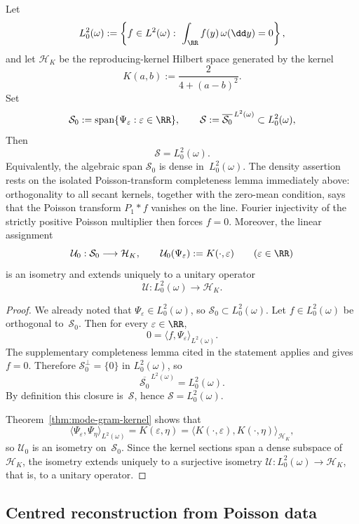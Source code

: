 \begin{theorem}%
\label{thm:mode-space-rkhs}
Let
\[
L^2_0(\omega):=
\left\{
f\in L^2(\omega):\ \int_{\RR}f(y)\,\omega(\dd y)=0
\right\},
\]
and let $\mathcal H_K$ be the reproducing-kernel Hilbert space generated
by the kernel
\[
K(a,b):=\frac{2}{4+(a-b)^2}.
\]
Set
\[
\mathcal S_0:=\operatorname{span}\{\Psi_\varepsilon:\varepsilon\in\RR\},
\qquad
\mathcal S:=\overline{\mathcal S_0}^{\,L^2(\omega)}
\subset L^2_0(\omega),
\]
Then
\[
\mathcal S=L^2_0(\omega).
\]
Equivalently, the algebraic span
$\mathcal S_0$ is dense in~$L^2_0(\omega)$.
The density assertion rests on the isolated Poisson-transform completeness
lemma immediately above: orthogonality to all secant kernels, together with
the zero-mean condition, says that the Poisson transform \(P_1*f\) vanishes
on the line.  Fourier injectivity of the strictly positive Poisson multiplier
then forces \(f=0\).
Moreover, the linear assignment
\[
\mathcal U_0:\mathcal S_0\longrightarrow \mathcal H_K,
\qquad
\mathcal U_0(\Psi_\varepsilon):=K(\cdot,\varepsilon)
\qquad(\varepsilon\in\RR)
\]
is an isometry and extends uniquely to a unitary operator
\[
\mathcal U:L^2_0(\omega)\longrightarrow \mathcal H_K.
\]
\end{theorem}

\begin{proof}
We already noted that $\Psi_\varepsilon\in L^2_0(\omega)$, so
$\mathcal S_0\subset L^2_0(\omega)$.  Let
$f\in L^2_0(\omega)$ be orthogonal to~$\mathcal S_0$.  Then for every
$\varepsilon\in\RR$,
\[
0=\langle f,\Psi_\varepsilon\rangle_{L^2(\omega)}.
\]
  The supplementary completeness lemma cited in the statement applies and
  gives $f=0$.
Therefore $\mathcal S_0^\perp=\{0\}$ in $L^2_0(\omega)$, so
\[
\overline{\mathcal S_0}^{\,L^2(\omega)}=L^2_0(\omega).
\]
By definition this closure is~$\mathcal S$, hence
$\mathcal S=L^2_0(\omega)$.

Theorem~\ref{thm:mode-gram-kernel} shows that
\[
\langle \Psi_\varepsilon,\Psi_\eta\rangle_{L^2(\omega)}
=K(\varepsilon,\eta)
=\langle K(\cdot,\varepsilon),K(\cdot,\eta)\rangle_{\mathcal H_K},
\]
so $\mathcal U_0$ is an isometry on~$\mathcal S_0$.  Since the
kernel sections span a dense subspace of~$\mathcal H_K$, the isometry
extends uniquely to a surjective isometry
$\mathcal U:L^2_0(\omega)\to\mathcal H_K$, that is, to a unitary
operator.
\end{proof}

\subsection{Centred reconstruction from Poisson data}

